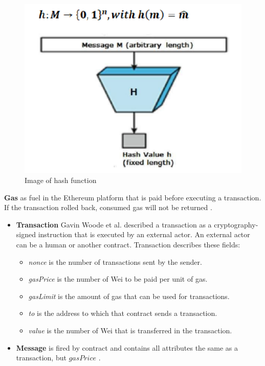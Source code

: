 \begin{center}
	\begin{figure}[htb!]
		
		\begin{minipage}{0.2\linewidth}
			\centering
			\includegraphics[width=4.5\textwidth]{images/chap01_hash_function.png}
		\end{minipage}
		\caption[Image of hash function]{Image of hash function \cite{Fips}}
		
	\end{figure}
	
\end{center}
\textbf{Gas} as fuel in the Ethereum platform that is paid before executing a transaction. If the transaction rolled back,  consumed gas will not be returned \cite{Egbertsen}.\\
\begin{itemize}
    \item \textbf{Transaction}
     Gavin Woode et al. \cite{Gavin} described a transaction as a cryptography-signed instruction that is executed by an external actor. An external actor can be a human or another contract. Transaction describes these fields:
     \begin{itemize}
         \item \textit{nonce} is the number of transactions sent by the sender.
         \item \textit{gasPrice} is the number of Wei to be paid per unit of gas.
         \item \textit{gasLimit} is the amount of gas that can be used for transactions.
         \item \textit{to} is the address to which that contract sends a transaction.
         \item \textit{value} is the number of Wei that is transferred in the transaction.
     \end{itemize}
        \item \textbf{Message} is fired by contract and contains all attributes the same as a transaction, but $gasPrice$ \cite{Egbertsen}.
\end{itemize}
